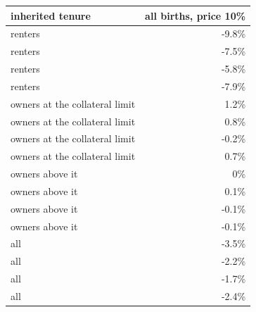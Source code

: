 \begin{tabular}{lr}
\toprule
inherited tenure & all births, price 10\% \\
\midrule
renters & -9.8\% \\
renters & -7.5\% \\
renters & -5.8\% \\
renters & -7.9\% \\
owners at the collateral limit & 1.2\% \\
owners at the collateral limit & 0.8\% \\
owners at the collateral limit & -0.2\% \\
owners at the collateral limit & 0.7\% \\
owners above it & 0\% \\
owners above it & 0.1\% \\
owners above it & -0.1\% \\
owners above it & -0.1\% \\
all & -3.5\% \\
all & -2.2\% \\
all & -1.7\% \\
all & -2.4\% \\
\bottomrule
\end{tabular}
